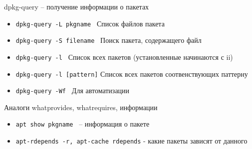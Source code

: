 \begin{frame}{dpkg-query -- получение информации о пакетах}
    \begin{itemize}
        \item {\tt dpkg-query -L pkgname } Список файлов пакета 
        \item {\tt dpkg-query -S filename } Поиск пакета, содержащего файл
        \item {\tt dpkg-query -l } Список всех пакетов (установленные начинаются с ii)
        \item {\tt dpkg-query -l [pattern]} Список всех пакетов соотвенствующих паттерну
       \item {\tt dpkg-query -Wf } Для автоматизации
    \end{itemize}
    \begin{center}
        Аналоги whatprovides, whatrequires, информации
    \end{center}
    \begin{itemize}
        \item {\tt apt show pkgname } -- информация о пакете
        \item {\tt apt-rdepends -r, apt-cache rdepends} - какие пакеты зависят от данного
    \end{itemize}
\end{frame}
